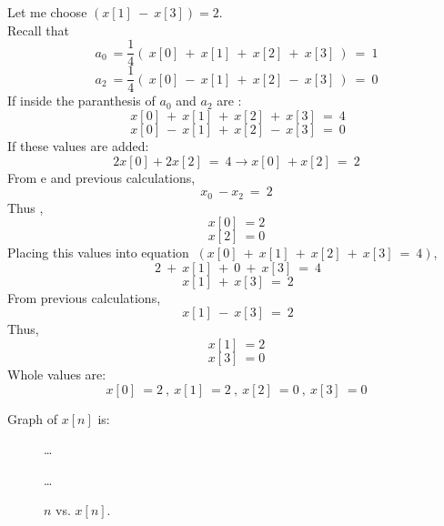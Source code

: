 \documentclass[10pt,a4paper, margin=1in]{article}
\begin{document}
\begin{enumerate}
Let me choose $(x[1]\ -\ x[3])=2$.\\
Recall that
$$a_0\ = \frac{1}{4}(\ x[0]\ + \ x[1]\ + \ x[2]\ + \ x[3]\ )\ =\ 1$$
$$a_2\ = \frac{1}{4}(\ x[0]\ - \ x[1]\ + \ x[2]\ - \ x[3]\ )\ =\ 0$$
If inside the paranthesis of $a_0$ and $a_2$ are :
$$\ x[0]\ + \ x[1]\ + \ x[2]\ + \ x[3]\ = \ 4 $$
$$\ x[0]\ - \ x[1]\ + \ x[2]\ - \ x[3]\ = \ 0$$
If these values are added:
$$ 2x[0] + 2x[2]\ =\ 4 \rightarrow x[0]\ + x[2]\ =\ 2$$
From e and previous calculations, 
$$x_0\ - x_2\ =\ 2 $$	
Thus , $$x[0]\ = 2$$ $$x[2]\ = 0$$
Placing this values into equation $\ (x[0]\ + \ x[1]\ + \ x[2]\ + \ x[3]\ = \ 4) $,
$$\ 2\ + \ x[1]\ + \ 0\ + \ x[3]\ = \ 4 $$
$$\ x[1]\ + \ x[3]\ = \ 2 $$
From previous calculations,
$$\ x[1]\ - \ x[3]\ = \ 2 $$
Thus, $$x[1]\ = 2$$ $$x[3]\ = 0$$
Whole values are:$$x[0]\ = 2\ ,\ x[1]\ = 2\ ,\ x[2]\ = 0\ ,\ x[3]\ = 0$$

Graph of $x[n]$ is:

\begin{figure} [H]
	\ldots
    \centering
    \ldots
    \caption{$n$ vs. $x[n]$.}
    \label{fig:q3}
\end{figure}


\end{enumerate}
\end{document}
